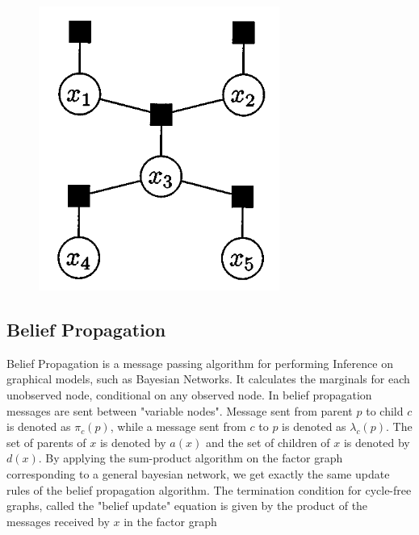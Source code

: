\documentclass[letterpaper,english,10pt]{article}
\begin{document}
\begin{figure}[htb]
\begin{minipage}[t]{.33\textwidth}
\end{minipage}%
\begin{minipage}[t]{.33\textwidth}%
  \centering
  \includegraphics[width=.6\linewidth]{exmpl_9_pic_3.png}
\end{minipage}
\end{figure}
\subsection{Belief Propagation}
Belief Propagation is a message passing algorithm for performing Inference on graphical models, such as Bayesian Networks. It calculates the 
marginals for each unobserved node, conditional on any observed node. In belief propagation messages are sent between "variable nodes". Message
sent from parent $p$ to child $c$ is denoted as $\pi_c(p)$, while a message sent from $c$ to $p$ is denoted as $\lambda_c(p)$. The set of 
parents of $x$ is denoted by $a(x)$ and the set of children of $x$ is denoted by $d(x)$.
\newline
\newline
By applying the sum-product algorithm on the factor
graph corresponding to a general bayesian network, we get exactly the same update rules of the belief propagation algorithm. 
The termination condition for cycle-free graphs, called the "belief update" equation is given by the product of the messages received by $x$
in the factor graph
\end{document}
